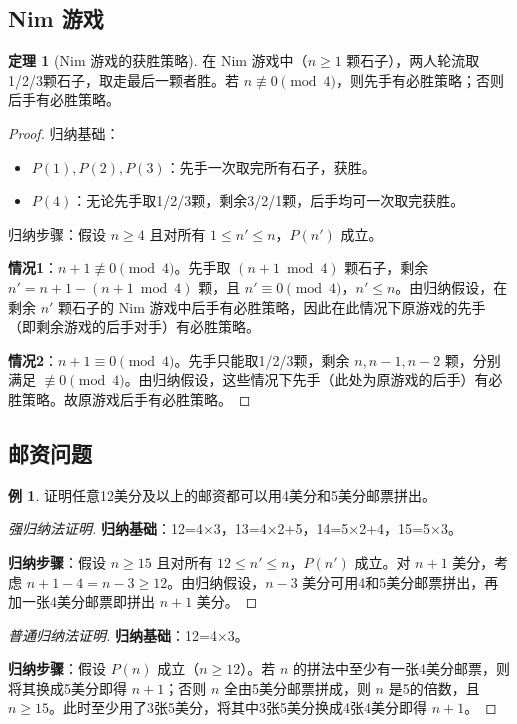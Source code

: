 \documentclass[UTF8,11pt,a4paper]{ctexbook}   %
\theoremstyle{definition}
\newtheorem{theorem}{定理}[section]
\newtheorem{example}{例}[section]
\begin{document}
\subsection{Nim 游戏}

\begin{theorem}[Nim 游戏的获胜策略]
在 Nim 游戏中（$n \geq 1$ 颗石子），两人轮流取1/2/3颗石子，取走最后一颗者胜。若 $n \not\equiv 0 \pmod{4}$，则先手有必胜策略；否则后手有必胜策略。
\end{theorem}

\begin{proof}
归纳基础：
\begin{itemize}
    \item $P(1),P(2),P(3)$：先手一次取完所有石子，获胜。
    \item $P(4)$：无论先手取1/2/3颗，剩余3/2/1颗，后手均可一次取完获胜。
\end{itemize}

归纳步骤：假设 $n \geq 4$ 且对所有 $1 \leq n' \leq n$，$P(n')$ 成立。

\textbf{情况1}：$n+1 \not\equiv 0 \pmod{4}$。先手取 $(n+1 \bmod 4)$ 颗石子，剩余 $n' = n+1 - (n+1 \bmod 4)$ 颗，且 $n' \equiv 0 \pmod{4}$，$n' \leq n$。由归纳假设，在剩余 $n'$ 颗石子的 Nim 游戏中后手有必胜策略，因此在此情况下原游戏的先手（即剩余游戏的后手对手）有必胜策略。

\textbf{情况2}：$n+1 \equiv 0 \pmod{4}$。先手只能取1/2/3颗，剩余 $n,n-1,n-2$ 颗，分别满足 $\not\equiv 0 \pmod{4}$。由归纳假设，这些情况下先手（此处为原游戏的后手）有必胜策略。故原游戏后手有必胜策略。
\end{proof}

\subsection{邮资问题}

\begin{example}
证明任意12美分及以上的邮资都可以用4美分和5美分邮票拼出。
\end{example}

\begin{proof}[强归纳法证明]
\textbf{归纳基础}：12=4×3，13=4×2+5，14=5×2+4，15=5×3。

\textbf{归纳步骤}：假设 $n \geq 15$ 且对所有 $12 \leq n' \leq n$，$P(n')$ 成立。对 $n+1$ 美分，考虑 $n+1-4 = n-3 \geq 12$。由归纳假设，$n-3$ 美分可用4和5美分邮票拼出，再加一张4美分邮票即拼出 $n+1$ 美分。
\end{proof}

\begin{proof}[普通归纳法证明]
\textbf{归纳基础}：12=4×3。

\textbf{归纳步骤}：假设 $P(n)$ 成立（$n \geq 12$）。若 $n$ 的拼法中至少有一张4美分邮票，则将其换成5美分即得 $n+1$；否则 $n$ 全由5美分邮票拼成，则 $n$ 是5的倍数，且 $n \geq 15$。此时至少用了3张5美分，将其中3张5美分换成4张4美分即得 $n+1$。
\end{proof}
\end{document}
